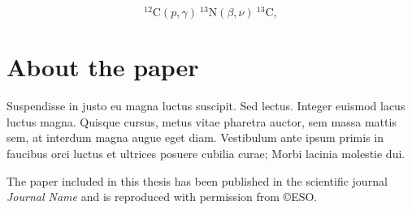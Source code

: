     \begin{equation}
       {}^{12}\text{C}(p, \gamma)\:{}^{13}\text{N}(\beta, \nu)\:{}^{13}\text{C}, 
    \end{equation}

\section{About the \citet{myPaper} paper}
Suspendisse in justo eu magna luctus suscipit. Sed lectus. Integer euismod lacus luctus magna. Quisque cursus, metus vitae pharetra auctor, sem massa mattis sem, at interdum magna augue eget diam. Vestibulum ante ipsum primis in faucibus orci luctus et ultrices posuere cubilia curae; Morbi lacinia molestie dui.

The paper included in this thesis has been published in the scientific journal \emph{Journal Name} and is reproduced with permission from ©ESO. 


